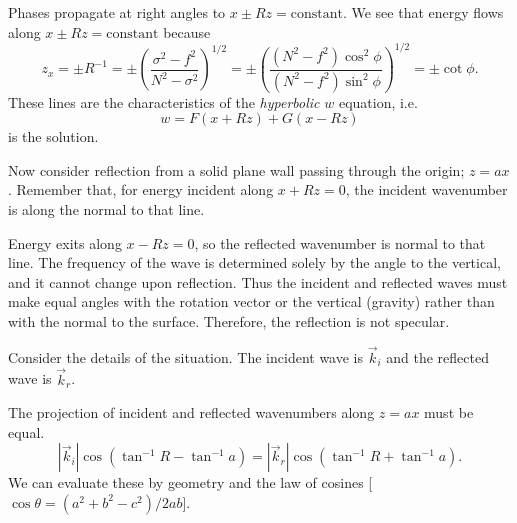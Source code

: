 
Phases propagate at right angles to $x\pm Rz=\text{constant}$. We see that energy flows
along $x\pm Rz=\text{constant}$ because
\[
	z_x=\pm R^{-1}
	=\pm\left(\frac{\sigma^2-f^2}{N^2-\sigma^2}\right)^{1/2}
	=\pm\left(\frac{(N^2-f^2)\cos^2\phi}
	{(N^2-f^2)\sin^2\phi}\right)^{1/2}
	=\pm\cot\phi.
\]
These lines are the characteristics of the \emph{hyperbolic} $w$ equation, i.e.
\[
	w=F(x+Rz)+G(x-Rz)
\]
is the solution.

Now consider reflection from a solid plane wall passing through the origin;
$z=ax$. Remember that, for energy incident along $x+Rz=0$, the incident
wavenumber is along the normal to that line.

\sourcepagebreak


Energy exits along $x-Rz=0$, so the reflected wavenumber is normal to that line.
The frequency of the wave is determined solely by the angle to the vertical, and it
cannot change upon reflection. Thus the incident and reflected waves must make equal
angles with the rotation vector or the vertical (gravity) rather than with the normal to
the surface. Therefore, the reflection is not specular.

Consider the details of the situation. The incident wave is $\vec k_i$ and the reflected
wave is $\vec k_r$.


The projection of incident and reflected wavenumbers along $z=ax$ must be equal.
\[
	|\vec k_i|\cos(\tan^{-1}R-\tan^{-1}a)
	=|\vec k_r|\cos(\tan^{-1}R+\tan^{-1}a).
\]
We can evaluate these by geometry and the law of cosines
	[$\cos\theta=(a^2+b^2-c^2)/2ab$].

\sourcepagebreak


